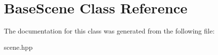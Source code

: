 \hypertarget{class_base_scene}{}\section{Base\+Scene Class Reference}
\label{class_base_scene}


The documentation for this class was generated from the following file\+:\begin{DoxyCompactItemize}
\item 
scene.\+hpp\end{DoxyCompactItemize}
